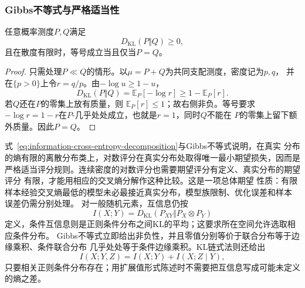 \subsubsection{Gibbs不等式与严格适当性}
\begin{theorem}[Gibbs不等式]
\label{thm:information-gibbs-inequality}
任意概率测度\(P,Q\)满足
\[
  D_{\mathrm{KL}}(P\Vert Q)\geq0,
\]
且在散度有限时，等号成立当且仅当\(P=Q\)。
\end{theorem}
\begin{proof}
只需处理\(P\ll Q\)的情形。以\(\mu=P+Q\)为共同支配测度，密度记为\(p,q\)，
并在\(\{p>0\}\)上令\(r=q/p\)。由\(-\log u\geq1-u\)，
\[
  D_{\mathrm{KL}}(P\Vert Q)
  =
  \mathbb{E}_P[-\log r]
  \geq
  1-\mathbb{E}_P[r].
\]
若\(Q\)还在\(P\)的零集上放有质量，则
\(\mathbb{E}_P[r]\leq1\)；故右侧非负。等号要求
\(-\log r=1-r\)在\(P\)-几乎处处成立，也就是\(r=1\)，同时\(Q\)不能在
\(P\)的零集上留下额外质量。因此\(P=Q\)。
\end{proof}
式~\eqref{eq:information-cross-entropy-decomposition}与Gibbs不等式说明，在真实
分布的熵有限的离散分布类上，对数评分在真实分布处取得唯一最小期望损失，因而是
严格适当评分规则。连续密度的对数评分也需要期望评分有定义、真实分布的期望评分
有限，才能用相应的交叉熵分解作这种比较。这是一项总体期望
性质：有限样本经验交叉熵最低的模型未必最接近真实分布，模型族限制、优化误差和样本
误差仍需分别处理。
对一般随机元素，互信息仍按
\[
  I(X;Y)=D_{\mathrm{KL}}(P_{XY}\Vert P_X\otimes P_Y)
\]
定义，条件互信息则是正则条件分布之间KL的平均；这要求所在空间允许选取相应条件分布。
Gibbs不等式立即给出非负性，并且零值分别等价于联合分布等于边缘乘积、条件联合分布
几乎处处等于条件边缘乘积。KL链式法则还给出
\[
  I(X;Y,Z)=I(X;Y)+I(X;Z\mid Y),
\]
只要相关正则条件分布存在；用扩展值形式陈述时不需要把互信息写成可能未定义的熵之差。
